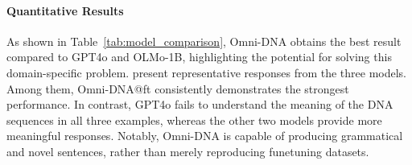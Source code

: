 


\paragraph{Quantitative Results} As shown in Table~\ref{tab:model_comparison}, Omni-DNA obtains the best result compared to GPT4o and OLMo-1B, highlighting the potential for solving this domain-specific problem.  present representative responses from the three models. Among them, Omni-DNA@ft consistently demonstrates the strongest performance. In contrast, GPT4o fails to understand the meaning of the DNA sequences in all three examples, whereas the other two models provide more meaningful responses. Notably, Omni-DNA is capable of producing grammatical and novel sentences, rather than merely reproducing funetuning datasets.

\begin{table}[t!]
\centering
\caption{Comparison of Weighted F1 Score and MCC for Omni-DNA@ft, GPT4o@zeroshot, OLMo-1B@ft, and Random Guess.}
\label{tab:model_comparison}
\vspace{-1em}
\end{table}



